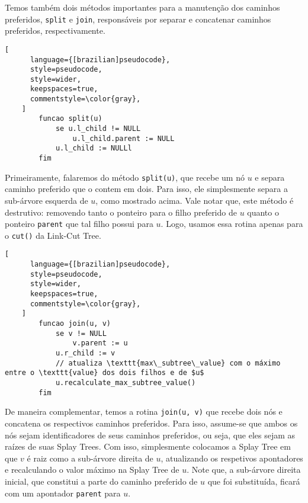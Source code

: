 Temos também dois métodos importantes para a manutenção dos caminhos preferidos, \texttt{split} e \texttt{join}, responsáveis por separar e concatenar caminhos preferidos, respectivamente.

\begin{programruledcaption}{\label{splay:split}}
    \begin{lstlisting}[
      language={[brazilian]pseudocode},
      style=pseudocode,
      style=wider,
      keepspaces=true,
      commentstyle=\color{gray},
    ]
        funcao split(u)
            se u.l_child != NULL
                u.l_child.parent := NULL    
            u.l_child := NULLl
        fim
    \end{lstlisting}
\end{programruledcaption}

Primeiramente, falaremos do método \texttt{split(u)}, que recebe um nó $u$ e separa caminho preferido que o contem em dois. Para isso, ele simplesmente separa a sub-árvore esquerda de $u$, como mostrado acima. Vale notar que, este método é destrutivo: removendo tanto o ponteiro para o filho preferido de $u$ quanto o ponteiro \texttt{parent} que tal filho possui para $u$. Logo, usamos essa rotina apenas para o \texttt{cut()} da Link-Cut Tree.

\begin{programruledcaption}{\label{splay:join}}
    \begin{lstlisting}[
      language={[brazilian]pseudocode},
      style=pseudocode,
      style=wider,
      keepspaces=true,
      commentstyle=\color{gray},
    ]
        funcao join(u, v)
            se v != NULL
                v.parent := u
            u.r_child := v
            // atualiza \texttt{max\_subtree\_value} com o máximo entre o \texttt{value} dos dois filhos e de $u$ 
            u.recalculate_max_subtree_value() 
        fim
    \end{lstlisting}
\end{programruledcaption}

De maneira complementar, temos a rotina \texttt{join(u, v)} que recebe dois nós e concatena os respectivos caminhos preferidos. Para isso, assume-se que ambos os nós sejam identificadores de seus caminhos preferidos, ou seja, que eles sejam as raízes de suas Splay Trees. Com isso, simplesmente colocamos a Splay Tree em que $v$ é raiz como a sub-árvore direita de $u$, atualizando os respetivos apontadores e recalculando o valor máximo na Splay Tree de $u$. Note que, a sub-árvore direita inicial, que constitui a parte do caminho preferido de $u$ que foi substituída, ficará com um apontador \texttt{parent} para $u$.

